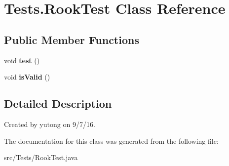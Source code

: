 \hypertarget{classTests_1_1RookTest}{\section{Tests.\-Rook\-Test Class Reference}
\label{classTests_1_1RookTest}
}
\subsection*{Public Member Functions}
\begin{DoxyCompactItemize}
\item 
\hypertarget{classTests_1_1RookTest_a8f59ba2ae46379636878d9c3b66aeb1e}{void {\bfseries test} ()}\label{classTests_1_1RookTest_a8f59ba2ae46379636878d9c3b66aeb1e}

\item 
\hypertarget{classTests_1_1RookTest_a63f02c95ad7e4fed50f3a647bbd6f710}{void {\bfseries is\-Valid} ()}\label{classTests_1_1RookTest_a63f02c95ad7e4fed50f3a647bbd6f710}

\end{DoxyCompactItemize}


\subsection{Detailed Description}
Created by yutong on 9/7/16. 

The documentation for this class was generated from the following file\-:\begin{DoxyCompactItemize}
\item 
src/\-Tests/Rook\-Test.\-java\end{DoxyCompactItemize}
